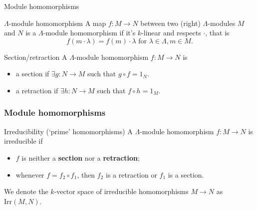 \begin{frame}{Module homomorphisms}
 \begin{alertblock}{$\Lambda$-module homomorphism}
 	A map $f:M \to N$ between two (right) $\Lambda$-modules $M$ and $N$ is a
 	$\Lambda$-module homomorphism if it's $k$-linear and respects $ \cdot $, that
 	is
 	\[
 	 f(m \cdot \lambda) = f(m) \cdot \lambda \text{ for } \lambda \in \Lambda, m
 	 \in M.
 	\]
 \end{alertblock}
 \pause
 \begin{block}{Section/retraction}
 	A $\Lambda$-module homomorphism $f:M \to N$ is
 	\vspace*{-\parskip}
 	\begin{itemize}
 	 \item a \alert{section} if $ \exists g: N \to M$ such that $g \circ f = 1_N$.
 	 \item a \alert{retraction} if $ \exists h: N \to M$ such that $f \circ h =
 	 	1_M$.
 	\end{itemize}
 \end{block}
\end{frame}

\begin{frame}[fragile]
 \frametitle{Module homomorphisms}
 \begin{block}{Irreducibility (`prime' homomorphisms)}
 	A $\Lambda$-module homomorphism $f:M \to N$ is \alert{irreducible} if
 	\begin{itemize}
 	 \item $f$ is neither a \textbf{section} nor a \textbf{retraction};
 	 \pause
 	 \item whenever $f = f_2 \circ f_1$, then $f_2$ is a retraction or $f_1$ is a
 	 	section.
 	\end{itemize}
 	We denote the $k$-vector space of irreducible homomorphisms $M \to N$ as
 	$\mathrm{Irr}(M,N)$.
 \end{block}
 \begin{figure}[h]
  \centering
 \end{figure}
\end{frame}

